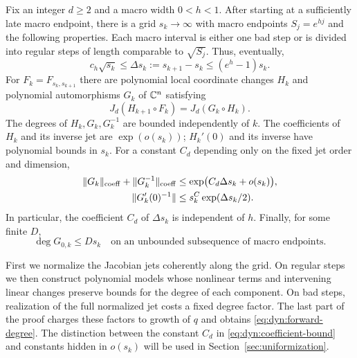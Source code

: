 \begin{proposition}\label{prop:polynomial-models}
Fix an integer $d\ge2$ and a macro width $0<h<1$.  After starting at a
sufficiently late macro endpoint, there is a grid $s_k\to\infty$ with
macro endpoints $S_j=e^{hj}$ and the following properties.  Each macro
interval is either one bad step or is divided into regular steps of
length comparable to $\sqrt{S_j}$.  Thus, eventually,
\begin{equation}
 c_h\sqrt{s_k}\le\Delta s_k:=s_{k+1}-s_k
 \le(e^h-1)s_k.
 \label{eq:dyn:grid-size}
\end{equation}
For $F_k=F_{s_k,s_{k+1}}$ there are polynomial local coordinate changes
$H_k$ and polynomial automorphisms $G_k$ of $\mathbb C^n$ satisfying
\begin{equation}
 J_d(H_{k+1}\circ F_k)=J_d(G_k\circ H_k).
 \label{eq:dyn:jet-conjugacy}
\end{equation}
The degrees of $H_k,G_k,G_k^{-1}$ are bounded independently of $k$.
The coefficients of $H_k$ and its inverse jet are $\exp(o(s_k))$;
$H_k'(0)$ and its inverse have polynomial bounds in $s_k$.
For a constant $C_d$ depending only on the fixed jet order and dimension,
\begin{align}
 \lVert G_k\rVert_{\mathrm{coeff}}+\lVert G_k^{-1}\rVert_{\mathrm{coeff}}
 &\le \exp\bigl(C_d\Delta s_k+o(s_k)\bigr),
 \label{eq:dyn:coefficient-bound}\\
 \lVert G_k'(0)^{-1}\rVert
 &\le s_k^{C}\exp(\Delta s_k/2).
 \label{eq:dyn:center-inverse}
\end{align}
In particular, the coefficient $C_d$ of $\Delta s_k$ is independent of
$h$.  Finally, for some finite $D$,
\begin{equation}
 \deg G_{0,k}\le D s_k
 \quad\text{on an unbounded subsequence of macro endpoints.}
 \label{eq:dyn:forward-degree}
\end{equation}
\end{proposition}

First we normalize the Jacobian jets coherently along the grid.
On regular steps we then construct polynomial models whose nonlinear
terms and intervening linear changes preserve bounds for the degree of
each component.  On bad steps, realization of the full normalized jet
costs a fixed degree factor.  The last part of the proof charges these
factors to growth of $q$ and obtains \eqref{eq:dyn:forward-degree}.
The distinction between the constant $C_d$ in
\eqref{eq:dyn:coefficient-bound} and constants hidden in $o(s_k)$ will
be used in Section~\ref{sec:uniformization}.

